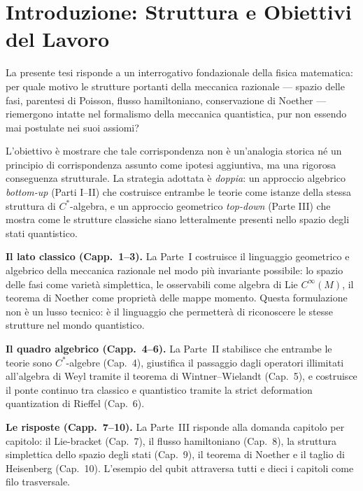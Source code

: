 \documentclass[12pt, a4paper]{article}
\begin{document}
	\newpage
	\section*{Introduzione: Struttura e Obiettivi del Lavoro}
	
	La presente tesi risponde a un interrogativo fondazionale della fisica matematica:
	per quale motivo le strutture portanti della meccanica razionale ---
	spazio delle fasi, parentesi di Poisson, flusso hamiltoniano, conservazione di Noether
	--- riemergono intatte nel formalismo della meccanica quantistica, pur non essendo mai
	postulate nei suoi assiomi?
	
	L'obiettivo è mostrare che tale corrispondenza non è un'analogia storica né un
	principio di corrispondenza assunto come ipotesi aggiuntiva, ma una rigorosa
	conseguenza strutturale. La strategia adottata è \emph{doppia}: un approccio
	algebrico \textit{bottom-up} (Parti I--II) che costruisce entrambe le teorie come
	istanze della stessa struttura di $C^*$-algebra, e un approccio geometrico
	\textit{top-down} (Parte III) che mostra come le strutture classiche siano
	letteralmente presenti nello spazio degli stati quantistico.
	
	\medskip
	
	\textbf{Il lato classico (Capp.\ 1--3).}
	La Parte~I costruisce il linguaggio geometrico e algebrico della meccanica razionale
	nel modo più invariante possibile: lo spazio delle fasi come varietà simplettica,
	le osservabili come algebra di Lie $C^\infty(M)$, il teorema di Noether come proprietà
	delle mappe momento. Questa formulazione non è un lusso tecnico: è il linguaggio
	che permetterà di riconoscere le stesse strutture nel mondo quantistico.
	
	\medskip
	
	\textbf{Il quadro algebrico (Capp.\ 4--6).}
	La Parte~II stabilisce che entrambe le teorie sono $C^*$-algebre (Cap.\ 4),
	giustifica il passaggio dagli operatori illimitati all'algebra di Weyl tramite
	il teorema di Wintner--Wielandt (Cap.\ 5), e costruisce il ponte continuo tra
	classico e quantistico tramite la strict deformation quantization di Rieffel (Cap.\ 6).
	
	\medskip
	
	\textbf{Le risposte (Capp.\ 7--10).}
	La Parte~III risponde alla domanda capitolo per capitolo: il Lie-bracket (Cap.\ 7),
	il flusso hamiltoniano (Cap.\ 8), la struttura simplettica dello spazio degli stati
	(Cap.\ 9), il teorema di Noether e il taglio di Heisenberg (Cap.\ 10).
	L'esempio del qubit attraversa tutti e dieci i capitoli come filo trasversale.
	
\end{document}
